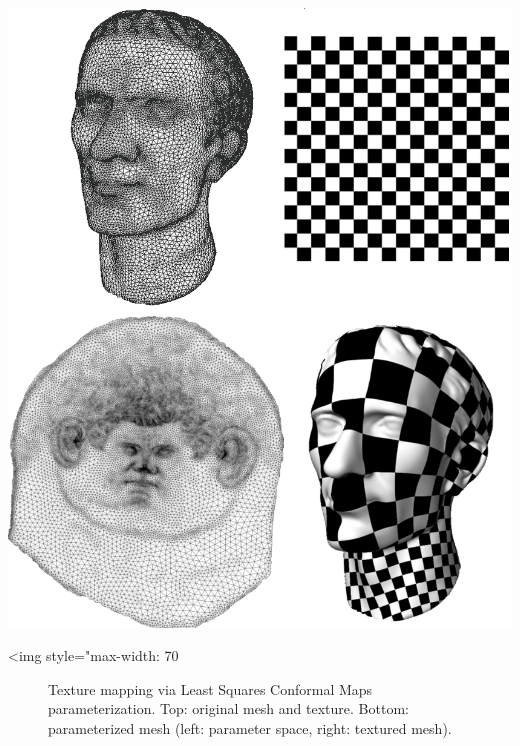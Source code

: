 \begin{center}
    \label{Surface_mesh_parameterization-fig-introduction}
    \begin{ccTexOnly}
        \includegraphics[width=1.0\textwidth]{Surface_mesh_parameterization/introduction} %
    \end{ccTexOnly}
    \begin{ccHtmlOnly}
        <img style="max-width: 70%
    \end{ccHtmlOnly}
    \begin{figure}[h]
        \caption{Texture mapping via Least Squares Conformal Maps parameterization. Top: original mesh and texture. Bottom: parameterized mesh (left: parameter space, right: textured mesh).}
    \end{figure}
\end{center}


